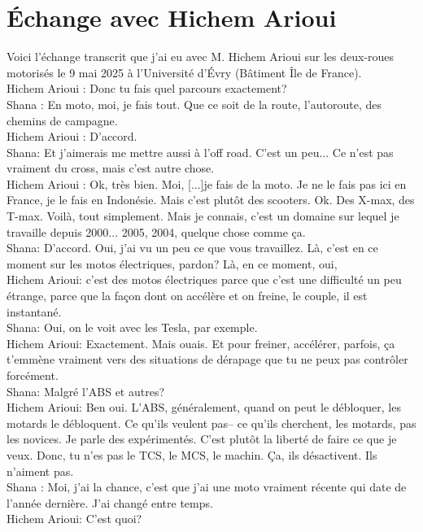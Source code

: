 \section{Échange avec Hichem Arioui}
Voici l'échange transcrit que j'ai eu avec M. Hichem Arioui sur les deux-roues motorisés le 9 mai 2025 à l'Université d'Évry (Bâtiment Île de France). \\
Hichem Arioui : Donc tu fais quel parcours exactement? \\
Shana : En moto, moi, je fais tout. Que ce soit de la route, l'autoroute, des chemins de campagne.\\
Hichem Arioui : D'accord. \\
Shana: Et j'aimerais me mettre aussi à l'off road. C'est un peu... Ce n'est pas vraiment du cross, mais c'est autre chose. \\
Hichem Arioui : Ok, très bien. Moi, [...]je fais de la moto. Je ne le fais pas ici en France, je le fais en Indonésie. Mais c'est plutôt des scooters. Ok. Des X-max, des T-max. Voilà, tout simplement. Mais je connais, c'est un domaine sur lequel je travaille depuis 2000... 2005, 2004, quelque chose comme ça. \\
Shana: D'accord. Oui, j'ai vu un peu ce que vous travaillez. Là, c'est en ce moment sur les motos électriques, pardon? Là, en ce moment, oui, \\
Hichem Arioui: c'est des motos électriques parce que c'est une difficulté un peu étrange, parce que la façon dont on accélère et on freine, le couple, il est instantané. \\
Shana: Oui, on le voit avec les Tesla, par exemple. \\
Hichem Arioui: Exactement. Mais ouais. Et pour freiner, accélérer, parfois, ça t'emmène vraiment vers des situations de dérapage que tu ne peux pas contrôler forcément. \\
Shana: Malgré l'ABS et autres? \\
Hichem Arioui: Ben oui. L'ABS, généralement, quand on peut le débloquer, les motards le débloquent. Ce qu'ils veulent pas-- ce qu'ils cherchent, les motards, pas les novices. Je parle des expérimentés. C'est plutôt la liberté de faire ce que je veux. Donc, tu n'es pas le TCS, le MCS, le machin. Ça, ils désactivent. Ils n'aiment pas. \\
Shana : Moi, j'ai la chance, c'est que j'ai une moto vraiment récente qui date de l'année dernière. J'ai changé entre temps. \\
Hichem Arioui: C'est quoi? \\
